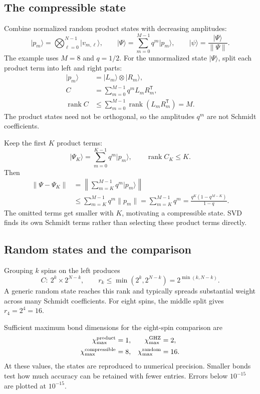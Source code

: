 \documentclass[11pt]{article}
\newcommand{\ket}[1]{\lvert #1\rangle}
\begin{document}
\newpage
\subsection*{The compressible state}
Combine normalized random product states with decreasing amplitudes:
\begin{equation}
\ket{p_m}=\bigotimes_{\ell=0}^{N-1}\ket{v_{m,\ell}},\qquad
\ket\Psi=\sum_{m=0}^{M-1}q^m\ket{p_m},\qquad
\ket\psi=\frac{\ket\Psi}{\|\Psi\|}.
\end{equation}
The example uses $M=8$ and $q=1/2$. For the unnormalized state $\ket\Psi$, split each product term into left and right parts:
\begin{align}
\ket{p_m}&=\ket{L_m}\otimes\ket{R_m},\\
C&=\sum_{m=0}^{M-1}q^m L_m R_m^{\mathsf T},\\
\operatorname{rank}C&\leq\sum_{m=0}^{M-1}\operatorname{rank}(L_mR_m^{\mathsf T})=M.
\end{align}
The product states need not be orthogonal, so the amplitudes $q^m$ are not Schmidt coefficients.

Keep the first $K$ product terms:
\begin{equation}
\ket{\Psi_K}=\sum_{m=0}^{K-1}q^m\ket{p_m},\qquad
\operatorname{rank}C_K\leq K.
\end{equation}
Then
\begin{align}
\|\Psi-\Psi_K\|
&=\left\|\sum_{m=K}^{M-1}q^m\ket{p_m}\right\|\\
&\leq\sum_{m=K}^{M-1}q^m\|p_m\|
=\sum_{m=K}^{M-1}q^m
=\frac{q^K(1-q^{M-K})}{1-q}.
\end{align}
The omitted terms get smaller with $K$, motivating a compressible state. SVD finds its own Schmidt terms rather than selecting these product terms directly.

\subsection*{Random states and the comparison}
Grouping $k$ spins on the left produces
\begin{equation}
C:\ 2^k\times2^{N-k},\qquad
r_k\leq\min(2^k,2^{N-k})=2^{\min(k,N-k)}.
\end{equation}
A generic random state reaches this rank and typically spreads substantial weight across many Schmidt coefficients. For eight spins, the middle split gives $r_4=2^4=16$.

Sufficient maximum bond dimensions for the eight-spin comparison are
\begin{align}
\chi_{\max}^{\rm product}&=1,&\chi_{\max}^{\rm GHZ}&=2,\\
\chi_{\max}^{\rm compressible}&=8,&\chi_{\max}^{\rm random}&=16.
\end{align}
At these values, the states are reproduced to numerical precision. Smaller bonds test how much accuracy can be retained with fewer entries. Errors below $10^{-15}$ are plotted at $10^{-15}$.
\end{document}
